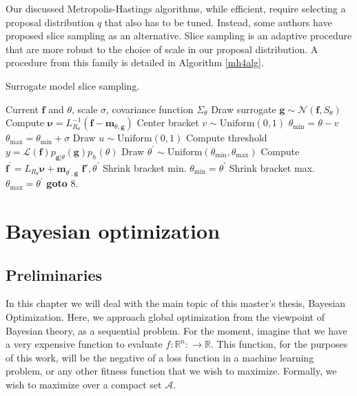 \documentclass[10pt,a4paper,twoside]{book}
\begin{document}
Our discussed Metropolis-Hastings algorithms, while efficient, require selecting a proposal distribution $q$ that also has to be tuned. Instead, some authors \cite{Murray2009, Murray2010} have proposed slice sampling as an alternative. Slice sampling \cite{Neal2003} is an adaptive procedure that are more robust to the choice of scale in our proposal distribution. A procedure from this family is detailed in Algorithm \ref{mh4alg}.

\begin{algorithm}
	\caption{Surrogate model slice sampling.}
		\label{mh4alg}
		\begin{algorithmic}[1]
		\Require Current $\boldsymbol{f}$ and $\theta$, scale $\sigma$, covariance function $\Sigma_\theta$ 
		\State Draw surrogate $\boldsymbol{g} \sim \mathcal{N}(\boldsymbol{f}, S_\theta)$
		\State Compute $\boldsymbol{\nu} = L_{R_\theta}^{-1}(\boldsymbol{f} - \boldsymbol{m}_{\theta, \boldsymbol{g}})$
		\State Center bracket $v \sim \mathrm{Uniform}(0, 1)$
		\State $\theta_{\mathrm{min}} = \theta - v$
		\State $\theta_{\mathrm{max}} = \theta_{\mathrm{min}} + \sigma$
		\State Draw $u \sim \mathrm{Uniform}(0, 1)$
		\State Compute threshold $y = \mathcal{L}(\boldsymbol{f})p_{\boldsymbol{g}|\theta}(\boldsymbol{g})p_h(\theta)$
		\State Draw $\theta^{'} \sim \mathrm{Uniform}(\theta_{\mathrm{min}}, \theta_{\mathrm{max}})$
		\State Compute $\boldsymbol{f}^{'} = L_{R_{\theta}}\boldsymbol{\nu} + \boldsymbol{m}_{\theta^{'}, \boldsymbol{g}}$
		\Return $\boldsymbol{f'}, \theta^{'}$
		\State Shrink bracket min. $\theta_{\mathrm{min}} = \theta^{'}$
		\Else
		\State Shrink bracket max. $\theta_{\mathrm{max}} = \theta^{'}$
		\EndIf
		\State \textbf{goto} 8.
		\end{algorithmic}
\end{algorithm}

\printbibliography

\chapter{Bayesian optimization}

\section{Preliminaries}

In this chapter we will deal with the main topic of this master's thesis, Bayesian Optimization. Here, we approach global optimization from the viewpoint of Bayesian theory, as a sequential problem. For the moment, imagine that we have a very expensive function to evaluate $f:\mathbb{R}^n: \rightarrow \mathbb{R}$. This function, for the purposes of this work, will be the negative of a loss function in a machine learning problem, or any other fitness function that we wish to maximize. Formally, we wish to maximize over a compact set $\mathcal{A}$.
\end{document}
